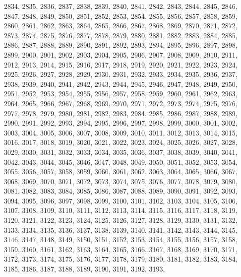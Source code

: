 \documentclass[a4paper,11pt]{article}
\numberwithin{equation}{section}
\begin{document}
2834, 2835, 2836, 2837, 2838, 2839, 2840, 2841, 2842, 2843, 2844, 2845,
2846, 2847, 2848, 2849, 2850, 2851, 2852, 2853, 2854, 2855, 2856, 2857,
2858, 2859, 2860, 2861, 2862, 2863, 2864, 2865, 2866, 2867, 2868, 2869,
2870, 2871, 2872, 2873, 2874, 2875, 2876, 2877, 2878, 2879, 2880, 2881,
2882, 2883, 2884, 2885, 2886, 2887, 2888, 2889, 2890, 2891, 2892, 2893,
2894, 2895, 2896, 2897, 2898, 2899, 2900, 2901, 2902, 2903, 2904, 2905,
2906, 2907, 2908, 2909, 2910, 2911, 2912, 2913, 2914, 2915, 2916, 2917,
2918, 2919, 2920, 2921, 2922, 2923, 2924, 2925, 2926, 2927, 2928, 2929,
2930, 2931, 2932, 2933, 2934, 2935, 2936, 2937, 2938, 2939, 2940, 2941,
2942, 2943, 2944, 2945, 2946, 2947, 2948, 2949, 2950, 2951, 2952, 2953,
2954, 2955, 2956, 2957, 2958, 2959, 2960, 2961, 2962, 2963, 2964, 2965,
2966, 2967, 2968, 2969, 2970, 2971, 2972, 2973, 2974, 2975, 2976, 2977,
2978, 2979, 2980, 2981, 2982, 2983, 2984, 2985, 2986, 2987, 2988, 2989,
2990, 2991, 2992, 2993, 2994, 2995, 2996, 2997, 2998, 2999, 3000, 3001,
3002, 3003, 3004, 3005, 3006, 3007, 3008, 3009, 3010, 3011, 3012, 3013,
3014, 3015, 3016, 3017, 3018, 3019, 3020, 3021, 3022, 3023, 3024, 3025,
3026, 3027, 3028, 3029, 3030, 3031, 3032, 3033, 3034, 3035, 3036, 3037,
3038, 3039, 3040, 3041, 3042, 3043, 3044, 3045, 3046, 3047, 3048, 3049,
3050, 3051, 3052, 3053, 3054, 3055, 3056, 3057, 3058, 3059, 3060, 3061,
3062, 3063, 3064, 3065, 3066, 3067, 3068, 3069, 3070, 3071, 3072, 3073,
3074, 3075, 3076, 3077, 3078, 3079, 3080, 3081, 3082, 3083, 3084, 3085,
3086, 3087, 3088, 3089, 3090, 3091, 3092, 3093, 3094, 3095, 3096, 3097,
3098, 3099, 3100, 3101, 3102, 3103, 3104, 3105, 3106, 3107, 3108, 3109,
3110, 3111, 3112, 3113, 3114, 3115, 3116, 3117, 3118, 3119, 3120, 3121,
3122, 3123, 3124, 3125, 3126, 3127, 3128, 3129, 3130, 3131, 3132, 3133,
3134, 3135, 3136, 3137, 3138, 3139, 3140, 3141, 3142, 3143, 3144, 3145,
3146, 3147, 3148, 3149, 3150, 3151, 3152, 3153, 3154, 3155, 3156, 3157,
3158, 3159, 3160, 3161, 3162, 3163, 3164, 3165, 3166, 3167, 3168, 3169,
3170, 3171, 3172, 3173, 3174, 3175, 3176, 3177, 3178, 3179, 3180, 3181,
3182, 3183, 3184, 3185, 3186, 3187, 3188, 3189, 3190, 3191, 3192, 3193,
\end{document}
